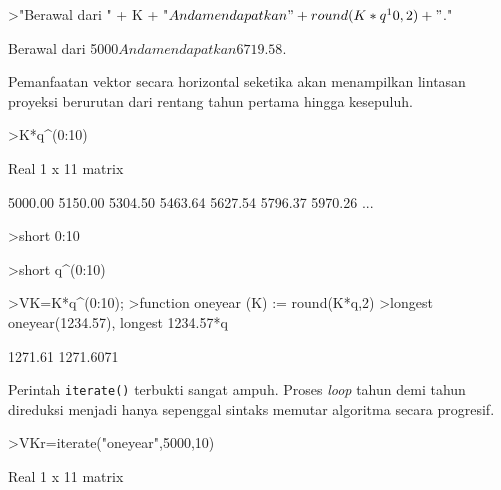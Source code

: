 \documentclass[a4paper,11pt,oneside,enabledeprecatedfontcommands]{scrbook}
\newenvironment{eulernotebook}{}{}
\newenvironment{eulercomment}{\par\medskip\noindent}{\par\medskip}
\begin{document}
\begin{eulernotebook}
\begin{eulerprompt}
>"Berawal dari " + K + "$ Anda mendapatkan " + round(K*q^10,2) + "$."
\end{eulerprompt}
\begin{euleroutput}
Berawal dari 5000$ Anda mendapatkan 6719.58$.
\end{euleroutput}
\begin{eulercomment}
Pemanfaatan vektor secara horizontal seketika akan menampilkan lintasan proyeksi berurutan dari rentang tahun pertama hingga kesepuluh.
\end{eulercomment}
\begin{eulerprompt}
>K*q^(0:10)
\end{eulerprompt}
\begin{euleroutput}
Real 1 x 11 matrix

    5000.00     5150.00     5304.50     5463.64     5627.54     5796.37     5970.26     ...
\end{euleroutput}
\begin{eulerprompt}
>short 0:10
\end{eulerprompt}
\begin{euleroutput}
[0,  1,  2,  3,  4,  5,  6,  7,  8,  9,  10]
\end{euleroutput}
\begin{eulerprompt}
>short q^(0:10)
\end{eulerprompt}
\begin{euleroutput}
[1,  1.03,  1.0609,  1.0927,  1.1255,  1.1593,  1.1941,  1.2299,  1.2668,  1.3048,  1.3439]
\end{euleroutput}
\begin{eulerprompt}
>VK=K*q^(0:10);
>function oneyear (K) := round(K*q,2)
>longest oneyear(1234.57), longest 1234.57*q
\end{eulerprompt}
\begin{euleroutput}
                1271.61 
              1271.6071 
\end{euleroutput}
\begin{eulercomment}
Perintah \texttt{iterate()} terbukti sangat ampuh. Proses \emph{loop} tahun demi tahun direduksi menjadi hanya sepenggal sintaks memutar algoritma secara progresif.
\end{eulercomment}
\begin{eulerprompt}
>VKr=iterate("oneyear",5000,10)
\end{eulerprompt}
\begin{euleroutput}
Real 1 x 11 matrix


\end{euleroutput}
\end{eulernotebook}
\end{document}
